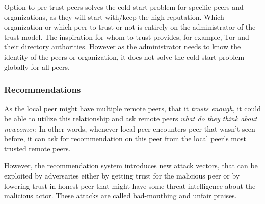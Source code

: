 Option to pre-trust peers solves the cold start problem for specific peers and organizations, as they will start with/keep the high reputation.
Which organization or which peer to trust or not is entirely on the administrator of the trust model. The inspiration for whom to trust provides, for example, Tor and their directory authorities\cite{torauth}. 
However as the administrator needs to know the identity of the peers or organization, it does not solve the cold start problem globally for all peers.

\subsubsection{Recommendations}
As the local peer might have multiple remote peers, that it \textit{trusts enough}, it could be able to utilize this relationship and ask remote peers \textit{what do they think about newcomer}. 
In other words, whenever local peer encounters peer that wasn't seen before, it can ask for recommendation on this peer from the local peer's most trusted remote peers.

However, the recommendation system introduces new attack vectors, that can be exploited by adversaries either by getting trust for the malicious peer or by lowering trust in honest peer that might have some threat intelligence about the malicious actor. 
These attacks are called bad-mouthing and unfair praises. 












